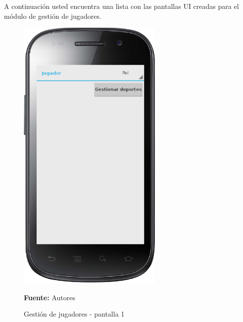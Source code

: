 A continuación usted encuentra una lista con las pantallas UI creadas para el módulo de gestión de jugadores.

\begin{figure}[!htb]
  \begin{center}
    \includegraphics[width=7cm]{./imagenes/UI/Jugador/gestion_jugador_1.png}
    \caption{Gestión de jugadores - pantalla 1}
    \label{fig:gestion_jugador_1}
    \textbf{Fuente:}  Autores
  \end{center}
\end{figure}

